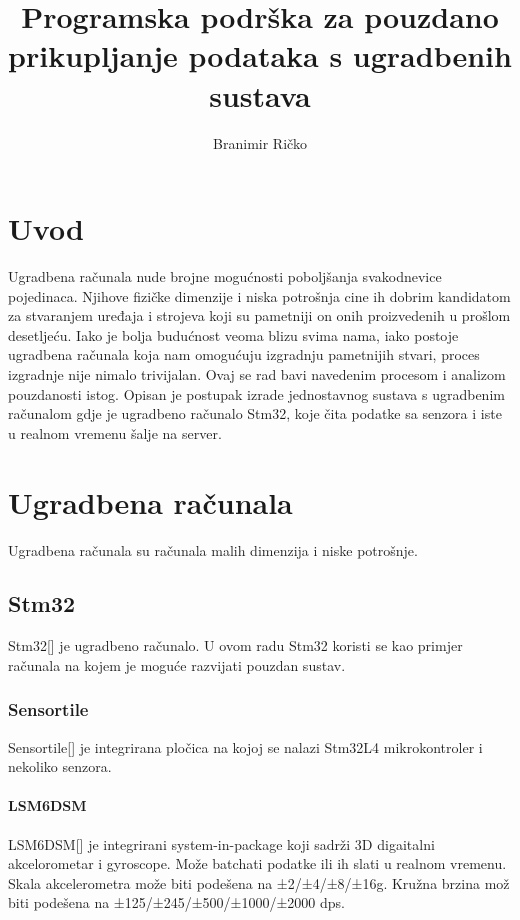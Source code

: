 \documentclass[times, utf8, diplomski]{diplomski}
\begin{document}

\title{Programska podrška za pouzdano prikupljanje podataka s ugradbenih sustava}

\author{Branimir Ričko}

\maketitle


\tableofcontents

\chapter{Uvod}
Ugradbena računala nude brojne mogućnosti poboljšanja svakodnevice pojedinaca. Njihove fizičke dimenzije i niska potrošnja cine ih dobrim kandidatom za stvaranjem uređaja i strojeva koji su pametniji on onih proizvedenih u prošlom desetljeću. Iako je bolja budućnost veoma blizu svima nama, iako postoje ugradbena računala koja nam omogućuju izgradnju pametnijih stvari, proces izgradnje nije nimalo trivijalan. Ovaj se rad bavi navedenim procesom i analizom pouzdanosti istog. Opisan je postupak izrade jednostavnog sustava s ugradbenim računalom gdje je ugradbeno računalo Stm32, koje čita podatke sa senzora i iste u realnom vremenu šalje na server.

\chapter{Ugradbena računala}
Ugradbena računala su računala malih dimenzija i niske potrošnje. 

\section{Stm32}
Stm32[\cite{STM32L476JG}] je ugradbeno računalo. U ovom radu Stm32 koristi se kao primjer računala na kojem je moguće razvijati pouzdan sustav.

\subsection{Sensortile}
Sensortile[\cite{sensortile}] je integrirana pločica na kojoj se nalazi Stm32L4 mikrokontroler i nekoliko senzora.

\subsubsection{LSM6DSM}
LSM6DSM[\cite{LSM6DSM}] je integrirani system-in-package koji sadrži 3D digaitalni akcelorometar i gyroscope. Može batchati podatke ili ih slati u realnom
vremenu. Skala akcelerometra može biti podešena na ±2/±4/±8/±16g. Kružna brzina mož biti podešena na
±125/±245/±500/±1000/±2000 dps.
\end{document}
